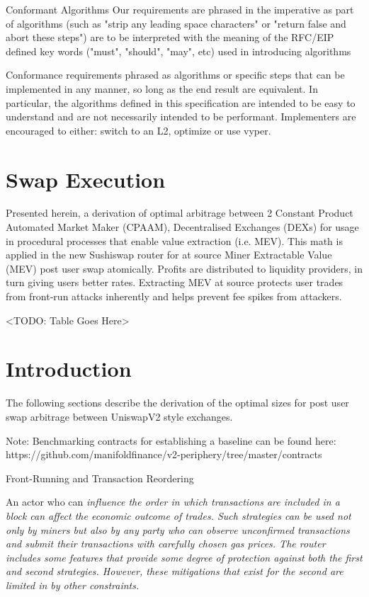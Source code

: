 \documentclass[runningheads]{llncs}
\begin{document}
Conformant Algorithms
Our requirements are phrased in the imperative as part of algorithms (such as "strip any leading space characters" or "return false and abort these steps") are to be interpreted with the meaning of the RFC/EIP defined key words ("must", "should", "may", etc) used in introducing algorithms

\hfill \break

Conformance requirements phrased as algorithms or specific steps that can be implemented in any manner, so long as the end result are equivalent. In particular, the algorithms defined in this specification are intended to be easy to understand and are not necessarily intended to be performant. Implementers are encouraged to either: switch to an L2, optimize or use vyper.

\section{Swap Execution}

Presented herein, a derivation of optimal arbitrage between 2 Constant Product Automated Market Maker (CPAAM), Decentralised Exchanges (DEXs) for usage in procedural processes that enable value extraction (i.e. MEV).
This math is applied in the new Sushiswap router for at source Miner Extractable Value (MEV) post user swap atomically.
Profits are distributed to liquidity providers, in turn giving users better rates. Extracting MEV at source protects user trades from front-run attacks inherently and helps prevent fee spikes from attackers.

<TODO: Table Goes Here>

\newpage

\section{Introduction}

The following sections describe the derivation of the optimal sizes for post user swap arbitrage between UniswapV2 style exchanges.

Note: Benchmarking contracts for establishing a baseline can be found here: https://github.com/manifoldfinance/v2-periphery/tree/master/contracts

Front-Running and Transaction Reordering

An actor who can \em{influence} the order in which transactions are included in a block can affect the economic outcome of trades. Such strategies can be used not only by miners but also by any party who can observe unconfirmed transactions and submit their transactions with carefully chosen gas prices. The router includes some features that provide some degree of protection against both the first and second strategies. However, these mitigations that exist for the second are limited in by other constraints.
\end{document}
